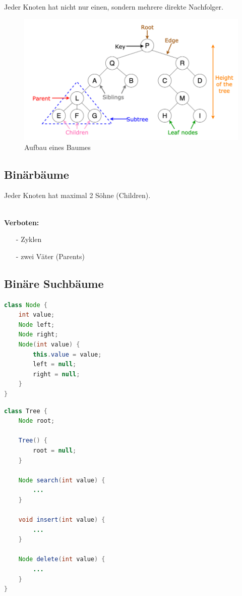 \documentclass{article}
\begin{document}
Jeder Knoten hat nicht nur einen, sondern mehrere direkte Nachfolger.

\begin{figure}[h!]
  \centering
  \includegraphics[scale=0.4]{tree_structure.png}
  \caption{Aufbau eines Baumes}
  \label{fig:tree_structure}
\end{figure}

\subsection{Binärbäume}

Jeder Knoten hat maximal 2 Söhne (Children).

\hfill\\
{\bf Verboten:}
\begin{itemize}
  \item[-] Zyklen
  \item[-] zwei Väter (Parents)
\end{itemize}

\subsection{Binäre Suchbäume}

\begin{lstlisting}[language=java, tabsize=4]
class Node {
    int value;
    Node left;
    Node right;
    Node(int value) {
        this.value = value;
        left = null;
        right = null;
    }
}
\end{lstlisting}
\newpage
\begin{lstlisting}[language=java, tabsize=4]
class Tree {
    Node root;
    
    Tree() {
        root = null;
    }
    
    Node search(int value) {
        ...
    }
    
    void insert(int value) {
        ...
    }
    
    Node delete(int value) {
        ...
    }
}
\end{lstlisting}
\end{document}
